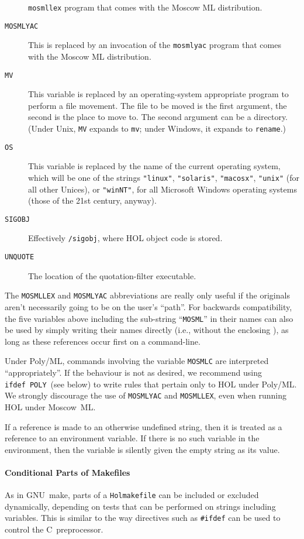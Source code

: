 \begin{description}
  \texttt{mosmllex} program that comes with the Moscow ML
  distribution.
\item[\texttt{MOSMLYAC}] This is replaced by an invocation of the
  \texttt{mosmlyac} program that comes with the Moscow ML
  distribution.
\item[\texttt{MV}] This variable is replaced by an operating-system
  appropriate program to perform a file movement.  The file to be
  moved is the first argument, the second is the place to move to.
  The second argument can be a directory.  (Under Unix, \texttt{MV}
  expands to \texttt{mv}; under Windows, it expands to \texttt{rename}.)
\item[\texttt{OS}] This variable is replaced by the name of the
  current operating system, which will be one of the strings
  \texttt{"linux"}, \texttt{"solaris"}, \texttt{"macosx"},
  \texttt{"unix"} (for all other Unices), or \texttt{"winNT"}, for all
  Microsoft Windows operating systems (those of the 21st century,
  anyway).
\item[\texttt{SIGOBJ}] Effectively \texttt{/sigobj},
  where HOL object code is stored.
  \item[\texttt{UNQUOTE}] The location of the quotation-filter executable.
\end{description}
The \texttt{MOSMLLEX} and \texttt{MOSMLYAC} abbreviations are really
only useful if the originals aren't necessarily going to be on the
user's ``path''.  For backwards compatibility, the five variables
above including the sub-string ``\texttt{MOSML}'' in their names can
also be used by simply writing their names directly (i.e., without the
enclosing \varref{\dots}), as long as these references occur first on
a command-line.

Under Poly/ML, commands involving the variable \texttt{MOSMLC} are interpreted ``appropriately''.
If the behaviour is not as desired, we recommend using \texttt{ifdef~POLY}~(see below) to write rules that pertain only to HOL under Poly/ML.
We strongly discourage the use of \texttt{MOSMLYAC} and \texttt{MOSMLLEX}, even when running HOL under Moscow~ML.

If a reference is made to an otherwise undefined string, then it is
treated as a reference to an environment variable.  If there is no
such variable in the environment, then the variable is silently given
the empty string as its value.

\paragraph{Conditional Parts of Makefiles}
As in GNU~\textsf{make}, parts of a \texttt{Holmakefile} can be included or excluded dynamically, depending on tests that can be performed on strings including variables.
%
This is similar to the way directives such as \texttt{\#ifdef} can be used to control the C~preprocessor.

